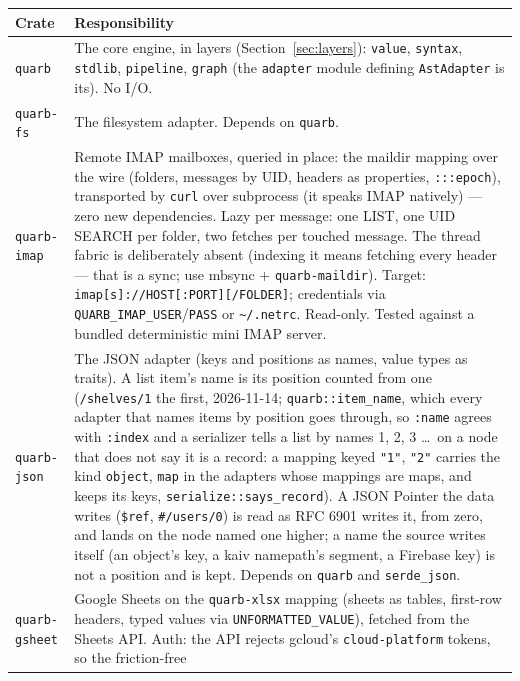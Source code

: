 \documentclass{report}
\begin{document}
\begin{xltabular}{\textwidth}{l X}
\toprule
\textbf{Crate} & \textbf{Responsibility} \\
\midrule
\texttt{quarb} & The core engine, in layers (Section~\ref{sec:layers}):
  \texttt{value}, \texttt{syntax}, \texttt{stdlib},
  \texttt{pipeline}, \texttt{graph} (the \texttt{adapter}
  module defining \texttt{AstAdapter} is its). No I/O. \\
\texttt{quarb-fs} & The filesystem adapter. Depends on \texttt{quarb}. \\
\texttt{quarb-imap} & Remote IMAP mailboxes, queried in place:
  the maildir mapping over the wire (folders, messages by UID,
  headers as properties, \texttt{:::epoch}), transported by
  \texttt{curl} over subprocess (it speaks IMAP natively) — zero
  new dependencies. Lazy per message: one LIST, one UID SEARCH
  per folder, two fetches per touched message. The thread fabric
  is deliberately absent (indexing it means fetching every header
  — that is a sync; use mbsync + \texttt{quarb-maildir}). Target:
  \texttt{imap[s]://HOST[:PORT][/FOLDER]}; credentials via
  \texttt{QUARB\_IMAP\_USER}/\texttt{PASS} or
  \texttt{\textasciitilde/.netrc}. Read-only. Tested against a
  bundled deterministic mini IMAP server. \\
\texttt{quarb-json} & The JSON adapter (keys and positions as names,
  value types as traits). A list item's name is its position
  counted from one (\texttt{/shelves/1} the first, 2026-11-14;
  \texttt{quarb::item\_name}, which every adapter that names items
  by position goes through, so \texttt{:name} agrees with
  \texttt{:index} and a serializer tells a list by names 1, 2, 3
  \ldots\ on a node that does not say it is a record: a mapping
  keyed \texttt{"1"}, \texttt{"2"} carries the kind
  \texttt{object}, \texttt{map} in the adapters whose mappings
  are maps, and keeps its keys,
  \texttt{serialize::says\_record}). A JSON Pointer the data
  writes (\texttt{\$ref},
  \texttt{\#/users/0}) is read as RFC 6901 writes it, from zero,
  and lands on the node named one higher; a name the source writes
  itself (an object's key, a kaiv namepath's segment, a Firebase
  key) is not a position and is kept. Depends on \texttt{quarb} and
  \texttt{serde\_json}. \\
\texttt{quarb-gsheet} & Google Sheets on the
  \texttt{quarb-xlsx} mapping (sheets as tables, first-row
  headers, typed values via \texttt{UNFORMATTED\_VALUE}),
  fetched from the Sheets API. Auth: the API rejects
  gcloud's \texttt{cloud-platform} tokens, so the friction-free

\end{xltabular}
\end{document}
